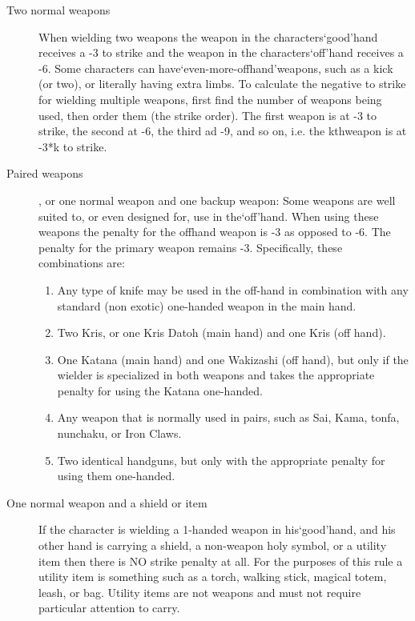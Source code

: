 \documentclass[twoside]{book}
\begin{document}
\begin{description}
    
  \item[Two normal weapons] 
    {  
    When wielding two weapons the weapon in the characters`good'hand receives a -3 to strike and the weapon in the characters`off'hand receives a -6. Some characters can have`even-more-offhand'weapons, such as a kick (or two), or literally having extra limbs. To calculate the negative to strike for wielding multiple weapons, first find the number of weapons being used, then order them (the strike order). The first weapon is at -3 to strike, the second at -6, the third ad -9, and so on, i.e. the kthweapon is at -3*k to strike.
    }
  
  \item[Paired weapons] 
    {  
    , or one normal weapon and one backup weapon: Some weapons are well suited to, or even designed for, use in the`off'hand. When using these weapons the penalty for the offhand weapon is -3 as opposed to -6. The penalty for the primary weapon remains -3. Specifically, these combinations are:
\begin{enumerate}
      
  \item 
    {  
    Any type of knife may be used in the off-hand in combination with any standard (non exotic) one-handed weapon in the main hand.
    }
  
  \item 
    {  
    Two Kris, or one Kris Datoh (main hand) and one Kris (off hand).
    }
  
  \item 
    {  
    One Katana (main hand) and one Wakizashi (off hand), but only if the wielder is specialized in both weapons and takes the appropriate penalty for using the Katana one-handed.
    }
  
  \item 
    {  
    Any weapon that is normally used in pairs, such as Sai, Kama, tonfa, nunchaku, or Iron Claws.
    }
  
  \item 
    {  
    Two identical handguns, but only with the appropriate penalty for using them one-handed.
    }
  
\end{enumerate}
  
    }
  
  \item[One normal weapon and a shield or item] 
    {  
    If the character is wielding a 1-handed weapon in his`good'hand, and his other hand is carrying a shield, a non-weapon holy symbol, or a utility item then there is NO strike penalty at all. For the purposes of this rule a utility item is something such as a torch, walking stick, magical totem, leash, or bag. Utility items are not weapons and must not require particular attention to carry.
    }
  
\end{description}
  
\end{document}
